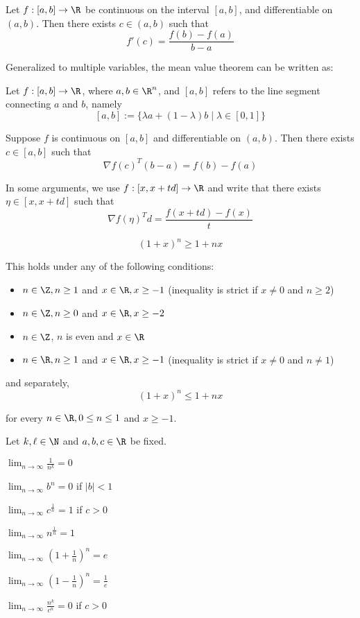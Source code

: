 \label{d37aa2b}

Let $f:[a,b]\to\R$ be continuous on the interval $[a,b]$, and differentiable on
$(a,b)$. Then there exists $c\in(a,b)$ such that
$$
  f'(c)=\frac{f(b)-f(a)}{b-a}
$$

Generalized to multiple variables, the mean value theorem can be written as:

Let $f:[a,b]\to\R$, where $a,b\in\R^n$, and $[a,b]$ refers to the line segment
connecting $a$ and $b$, namely
$$
  [a,b]:=\{\lambda a+(1-\lambda)b\mid\lambda\in[0,1]\}
$$

Suppose $f$ is continuous on $[a,b]$ and differentiable on $(a,b)$. Then there
exists $c\in[a,b]$ such that
$$
  \nabla f(c)^T(b-a)=f(b)-f(a)
$$

In some arguments, we use $f:[x,x+td]\to\R$ and write that there exists
$\eta\in[x,x+td]$ such that
$$
  \nabla f(\eta)^Td=\frac{f(x+td)-f(x)}t
$$

\label{d44713f}

$$
  (1+x)^n\geq 1+nx
$$

This holds under any of the following conditions:
\begin{itemize}
  \item $n\in\Z,n\geq1$ and $x\in\R,x\geq-1$ (inequality is strict if
        $x\neq0$ and $n\geq2$)
  \item $n\in\Z,n\geq0$ and $x\in\R,x\geq-2$
  \item $n\in\Z$, $n$ is even and $x\in\R$
  \item $n\in\R,n\geq1$ and $x\in\R,x\geq-1$ (inequality is strict if
        $x\neq0$ and $n\neq1$)
\end{itemize}

and separately,
$$
  (1+x)^n\leq 1+nx
$$

for every $n\in\R,0\leq n\leq 1$ and $x\geq-1$.

\label{ffc8953}

Let $k,\ell\in\N$ and $a,b,c\in\R$ be fixed.
\begin{enumerata}
  \def\li{\displaystyle\lim_{n\to\infty}}
  \item $\li\frac1{n^k}=0$
  \item $\li b^n=0$ \quad if \quad $|b|<1$
  \item $\li c^{\frac1n}=1$ \quad if \quad $c>0$
  \item $\li n^{\frac1n}=1$
  \item $\li \left(1+\frac1n\right)^n=e$
  \item $\li \left(1-\frac1n\right)^n=\frac1e$
  \item $\li \frac{n^k}{c^n}=0$ \quad if \quad $c>0$
\end{enumerata}

